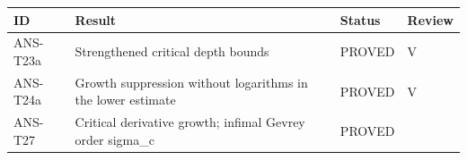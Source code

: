 \documentclass[
  11pt,
]{article}
\begin{document}
\begin{longtable}[]{@{}llll@{}}
\toprule
\begin{minipage}[b]{0.16\columnwidth}\raggedright
ID\strut
\end{minipage} & \begin{minipage}[b]{0.41\columnwidth}\raggedright
Result\strut
\end{minipage} & \begin{minipage}[b]{0.22\columnwidth}\raggedright
Status\strut
\end{minipage} & \begin{minipage}[b]{0.10\columnwidth}\raggedright
Review\strut
\end{minipage}\tabularnewline
\midrule
\endhead
\begin{minipage}[t]{0.16\columnwidth}\raggedright
ANS-T23a\strut
\end{minipage} & \begin{minipage}[t]{0.41\columnwidth}\raggedright
Strengthened critical depth bounds\strut
\end{minipage} & \begin{minipage}[t]{0.22\columnwidth}\raggedright
PROVED\strut
\end{minipage} & \begin{minipage}[t]{0.10\columnwidth}\raggedright
V\strut
\end{minipage}\tabularnewline
\begin{minipage}[t]{0.16\columnwidth}\raggedright
ANS-T24a\strut
\end{minipage} & \begin{minipage}[t]{0.41\columnwidth}\raggedright
Growth suppression without logarithms in the lower estimate\strut
\end{minipage} & \begin{minipage}[t]{0.22\columnwidth}\raggedright
PROVED\strut
\end{minipage} & \begin{minipage}[t]{0.10\columnwidth}\raggedright
V\strut
\end{minipage}\tabularnewline
\begin{minipage}[t]{0.16\columnwidth}\raggedright
ANS-T27\strut
\end{minipage} & \begin{minipage}[t]{0.41\columnwidth}\raggedright
Critical derivative growth; infimal Gevrey order sigma\_c\strut
\end{minipage} & \begin{minipage}[t]{0.22\columnwidth}\raggedright
PROVED\strut

\end{minipage}
\end{longtable}
\end{document}
